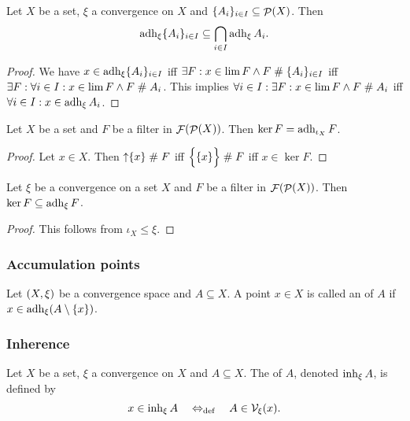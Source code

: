 \begin{lemma}
Let $X$ be a set, $\xi$ a convergence on $X$ and $\{A_i\}_{i\in I} \subseteq \mathop{\mathcal{P}}(X)$. Then
\[ \operatorname{adh}_\xi \{A_i\}_{i\in I} \subseteq \bigcap_{i\in I}\operatorname{adh}_\xi A_i. \]
\end{lemma}
\begin{proof}
We have $x\in \operatorname{adh}_\xi \{A_i\}_{i\in I}$ iff $\exists F: x\in \lim F \land F\mathrel{\#} \{A_i\}_{i\in I}$ iff $\exists F: \forall i\in I: x\in \lim F \land F\mathrel{\#} A_i$. This implies $\forall i\in I: \exists F: x\in \lim F \land F\mathrel{\#} A_i$ iff $\forall i\in I: x\in \operatorname{adh}_\xi A_i$.
\end{proof}



\begin{lemma}
Let $X$ be a set and $F$ be a filter in $\mathop{\mathcal{F}}(\mathop{\mathcal{P}}(X))$. Then $\ker F = \operatorname{adh}_{\iota_X} F$.
\end{lemma}
\begin{proof}
Let $x\in X$. Then $\mathop{\uparrow}\{x\} \mathrel{\#} F$ iff $\Big\{\{x\}\Big\} \mathrel{\#} F$ iff $x\in \ker F$.
\end{proof}
\begin{corollary}
Let $\xi$ be a convergence on a set $X$ and $F$ be a filter in $\mathop{\mathcal{F}}(\mathop{\mathcal{P}}(X))$. Then $\ker F \subseteq \operatorname{adh}_\xi F$.
\end{corollary}
\begin{proof}
This follows from $\iota_X \leq \xi$.
\end{proof}



\subsubsection{Accumulation points}
\begin{definition}
Let $\left( X,\xi \right)$ be a convergence space and $A\subseteq X$. A point $x\in X$ is called an  of $A$ if $x\in \operatorname{adh}_\xi(A\setminus\{x\})$.
\end{definition}

\subsubsection{Inherence}
\begin{definition}
Let $X$ be a set, $\xi$ a convergence on $X$ and $A \subseteq X$. The  of $A$, denoted $\operatorname{inh}_\xi A$, is defined by
\[ x\in \operatorname{inh}_\xi A \quad\Leftrightarrow_{\text{def}}\quad A\in \mathcal{V}_\xi(x). \]
\end{definition}

